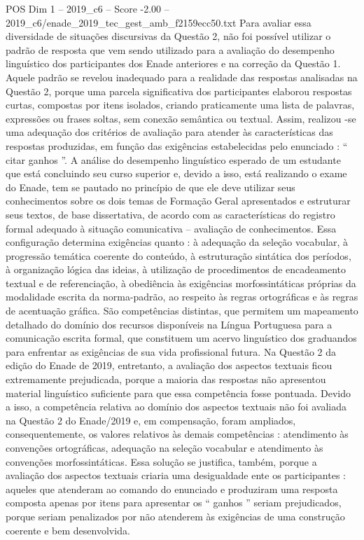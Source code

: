 \begin{textsample}{POS Dim 1 – 2019\_c6 – Score -2.00 – 2019\_c6/enade\_2019\_tec\_gest\_amb\_f2159ecc50.txt}
Para avaliar essa diversidade de situações discursivas da Questão 2, não foi possível utilizar o padrão de resposta que vem sendo utilizado para a avaliação do desempenho linguístico dos participantes dos Enade anteriores e na correção da Questão 1.
Aquele padrão se revelou inadequado para a realidade das respostas analisadas na Questão 2, porque uma parcela significativa dos participantes elaborou respostas curtas, compostas por itens isolados, criando praticamente uma lista de palavras, expressões ou frases soltas, sem conexão semântica ou textual.
Assim, realizou -se uma adequação dos critérios de avaliação para atender às características das respostas produzidas, em função das exigências estabelecidas pelo enunciado : “ citar ganhos ”.
A análise do desempenho linguístico esperado de um estudante que está concluindo seu curso superior e, devido a isso, está realizando o exame do Enade, tem se pautado no princípio de que ele deve utilizar seus conhecimentos sobre os dois temas de Formação Geral apresentados e estruturar seus textos, de base dissertativa, de acordo com as características do registro formal adequado à situação comunicativa – avaliação de conhecimentos.
Essa configuração determina exigências quanto : à adequação da seleção vocabular, à progressão temática coerente do conteúdo, à estruturação sintática dos períodos, à organização lógica das ideias, à utilização de procedimentos de encadeamento textual e de referenciação, à obediência às exigências morfossintáticas próprias da modalidade escrita da norma-padrão, ao respeito às regras ortográficas e às regras de acentuação gráfica.
São competências distintas, que permitem um mapeamento detalhado do domínio dos recursos disponíveis na Língua Portuguesa para a comunicação escrita formal, que constituem um acervo linguístico dos graduandos para enfrentar as exigências de sua vida profissional futura.
Na Questão 2 da edição do Enade de 2019, entretanto, a avaliação dos aspectos textuais ficou extremamente prejudicada, porque a maioria das respostas não apresentou material linguístico suficiente para que essa competência fosse pontuada.
Devido a isso, a competência relativa ao domínio dos aspectos textuais não foi avaliada na Questão 2 do Enade/2019 e, em compensação, foram ampliados, consequentemente, os valores relativos às demais competências : atendimento às convenções ortográficas, adequação na seleção vocabular e atendimento às convenções morfossintáticas.
Essa solução se justifica, também, porque a avaliação dos aspectos textuais criaria uma desigualdade ente os participantes : aqueles que atenderam ao comando do enunciado e produziram uma resposta composta apenas por itens para apresentar os “ ganhos ” seriam prejudicados, porque seriam penalizados por não atenderem às exigências de uma construção coerente e bem desenvolvida.

\end{textsample}

